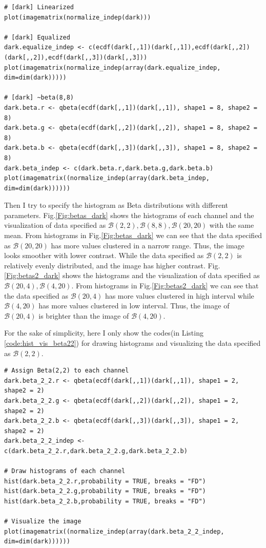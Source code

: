 \documentclass[conference,onecolumn]{IEEEtran}
\begin{document}
\begin{lstlisting}[caption={Linearize, equalize and assign $\mathcal{B}(8,8)$ histogram to \textit{dark} data},label={code:LiEqBe_dark}]
# [dark] Linearized
plot(imagematrix(normalize_indep(dark)))

# [dark] Equalized
dark.equalize_indep <- c(ecdf(dark[,,1])(dark[,,1]),ecdf(dark[,,2])(dark[,,2]),ecdf(dark[,,3])(dark[,,3]))
plot(imagematrix(normalize_indep(array(dark.equalize_indep, dim=dim(dark)))))

# [dark] ~beta(8,8)
dark.beta.r <- qbeta(ecdf(dark[,,1])(dark[,,1]), shape1 = 8, shape2 = 8)
dark.beta.g <- qbeta(ecdf(dark[,,2])(dark[,,2]), shape1 = 8, shape2 = 8)
dark.beta.b <- qbeta(ecdf(dark[,,3])(dark[,,3]), shape1 = 8, shape2 = 8)
dark.beta_indep <- c(dark.beta.r,dark.beta.g,dark.beta.b)
plot(imagematrix((normalize_indep(array(dark.beta_indep, dim=dim(dark))))))
\end{lstlisting}


Then I try to specify the histogram as Beta distributions with different parameters. Fig.\ref{Fig:betas_dark} shows the histograms of each channel and the visualization of data specified as $\mathcal{B}(2,2), \mathcal{B}(8,8), \mathcal{B}(20,20)$ with the same mean. From histograms in Fig.\ref{Fig:betas_dark} we can see that the data specified as $\mathcal{B}(20,20)$ has more values clustered in a narrow range. Thus, the image looks smoother with lower contrast. While the data specified as $\mathcal{B}(2,2)$ is relatively evenly distributed, and the image has higher contrast. Fig.\ref{Fig:betas2_dark} shows the histograms and the visualization of data specified as $\mathcal{B}(20,4), \mathcal{B}(4,20)$. From histograms in Fig.\ref{Fig:betas2_dark} we can see that the data specified as $\mathcal{B}(20,4)$ has more values clustered in high interval while $\mathcal{B}(4,20)$ has more values clustered in low interval. Thus, the image of $\mathcal{B}(20,4)$ is brighter than the image of $\mathcal{B}(4,20)$.

For the sake of simplicity, here I only show the codes(in Listing \ref{code:hist_vis_beta22}) for drawing histograms and visualizing the data specified as $\mathcal{B}(2,2)$.

\begin{lstlisting}[caption={Drawing histograms and visualizing the data specified as $\mathcal{B}(2,2)$},label={code:hist_vis_beta22}]
# Assign Beta(2,2) to each channel
dark.beta_2_2.r <- qbeta(ecdf(dark[,,1])(dark[,,1]), shape1 = 2, shape2 = 2)
dark.beta_2_2.g <- qbeta(ecdf(dark[,,2])(dark[,,2]), shape1 = 2, shape2 = 2)
dark.beta_2_2.b <- qbeta(ecdf(dark[,,3])(dark[,,3]), shape1 = 2, shape2 = 2)
dark.beta_2_2_indep <- c(dark.beta_2_2.r,dark.beta_2_2.g,dark.beta_2_2.b)

# Draw histograms of each channel
hist(dark.beta_2_2.r,probability = TRUE, breaks = "FD")
hist(dark.beta_2_2.g,probability = TRUE, breaks = "FD")
hist(dark.beta_2_2.b,probability = TRUE, breaks = "FD")

# Visualize the image
plot(imagematrix((normalize_indep(array(dark.beta_2_2_indep, dim=dim(dark))))))
\end{lstlisting}
\end{document}
